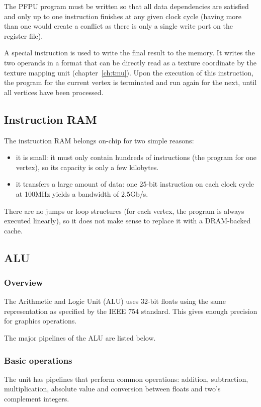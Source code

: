 \documentclass[a4paper,11pt]{kthesis}
\begin{document}
The PFPU program must be written so that all data dependencies are satisfied and only up to one instruction finishes at any given clock cycle (having more than one would create a conflict as there is only a single write port on the register file).

A special instruction is used to write the final result to the memory. It writes the two operands in a format that can be directly read as a texture coordinate by the texture mapping unit (chapter~\ref{ch:tmu}). Upon the execution of this instruction, the program for the current vertex is terminated and run again for the next, until all vertices have been processed.

\subsection{Instruction RAM}
The instruction RAM belongs on-chip for two simple reasons:
\begin{itemize}
\item it is small: it must only contain hundreds of instructions (the program for one vertex), so its capacity is only a few kilobytes.
\item it transfers a large amount of data: one 25-bit instruction on each clock cycle at 100MHz yields a bandwidth of 2.5Gb/s.
\end{itemize}
There are no jumps or loop structures (for each vertex, the program is always executed linearly), so it does not make sense to replace it with a DRAM-backed cache.

\subsection{ALU}
\subsubsection{Overview}
The Arithmetic and Logic Unit (ALU) uses 32-bit floats using the same representation as specified by the IEEE 754 standard. This gives enough precision for graphics operations.

The major pipelines of the ALU are listed below.

\subsubsection{Basic operations}
The unit has pipelines that perform common operations: addition, subtraction, multiplication, absolute value and conversion between floats and two's complement integers.
\end{document}
